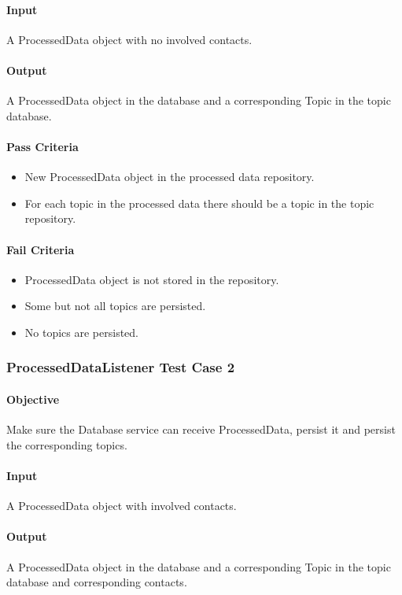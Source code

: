 \documentclass[hidelinks,english]{article}
\begin{document}
				\paragraph{Input} A ProcessedData object with no involved contacts.
				\paragraph{Output} A ProcessedData object in the database and a corresponding Topic in the topic database.
				\paragraph{Pass Criteria}
				\begin{itemize}
					\item New ProcessedData object in the processed data repository.
					\item For each topic in the processed data there should be a topic in the topic repository.
				\end{itemize}
				\paragraph{Fail Criteria}
				\begin{itemize}
					\item ProcessedData object is not stored in the repository.
					\item Some but not all topics are persisted.
					\item No topics are persisted.
				\end{itemize}
				
			\subsubsection{ProcessedDataListener Test Case 2}\label{databaseprocesseddatalistenertest2}
				\paragraph{Objective} Make sure the Database service can receive ProcessedData, persist it and persist the corresponding topics.
				\paragraph{Input} A ProcessedData object with involved contacts.
				\paragraph{Output} A ProcessedData object in the database and a corresponding Topic in the topic database and corresponding contacts.
\end{document}

